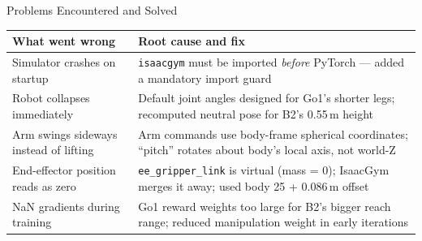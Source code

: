 \documentclass[10pt,aspectratio=169]{beamer}
\begin{document}
\begin{frame}{Problems Encountered and Solved}
  \footnotesize
  \begin{table}
    \centering
    \renewcommand{\arraystretch}{1.25}
    \begin{tabular}{>{\raggedright\arraybackslash}p{4cm}
                    >{\raggedright\arraybackslash}p{8.5cm}}
      \toprule
      \textbf{What went wrong} & \textbf{Root cause and fix} \\
      \midrule
      Simulator crashes on startup &
      \texttt{isaacgym} must be imported \emph{before} PyTorch ---
      added a mandatory import guard \\

      Robot collapses immediately &
      Default joint angles designed for Go1's shorter legs;
      recomputed neutral pose for B2's 0.55\,m height \\

      Arm swings sideways instead of lifting &
      Arm commands use body-frame spherical coordinates;
      ``pitch'' rotates about body's local axis, not world-Z \\

      End-effector position reads as zero &
      \texttt{ee\_gripper\_link} is virtual (mass = 0); IsaacGym
      merges it away; used body 25 + 0.086\,m offset \\

      NaN gradients during training &
      Go1 reward weights too large for B2's bigger reach range;
      reduced manipulation weight in early iterations \\
      \bottomrule
    \end{tabular}
  \end{table}
\end{frame}

\end{document}
